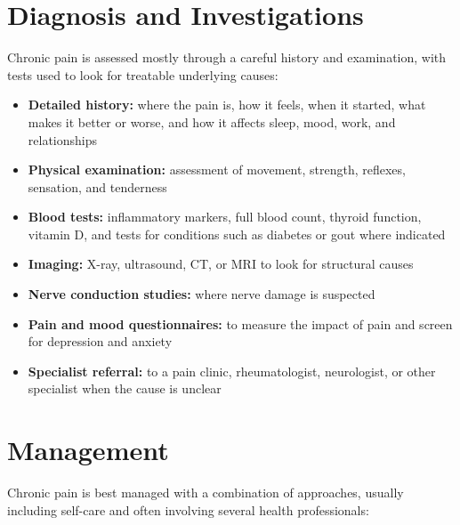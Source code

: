 \section*{Diagnosis and Investigations}
Chronic pain is assessed mostly through a careful history and examination, with tests used to look for treatable underlying causes:

\begin{itemize}
    \item \textbf{Detailed history:} where the pain is, how it feels, when it started, what makes it better or worse, and how it affects sleep, mood, work, and relationships
    \item \textbf{Physical examination:} assessment of movement, strength, reflexes, sensation, and tenderness
    \item \textbf{Blood tests:} inflammatory markers, full blood count, thyroid function, vitamin D, and tests for conditions such as diabetes or gout where indicated
    \item \textbf{Imaging:} X-ray, ultrasound, CT, or MRI to look for structural causes
    \item \textbf{Nerve conduction studies:} where nerve damage is suspected
    \item \textbf{Pain and mood questionnaires:} to measure the impact of pain and screen for depression and anxiety
    \item \textbf{Specialist referral:} to a pain clinic, rheumatologist, neurologist, or other specialist when the cause is unclear
\end{itemize}

\section*{Management}
Chronic pain is best managed with a combination of approaches, usually including self-care and often involving several health professionals:

